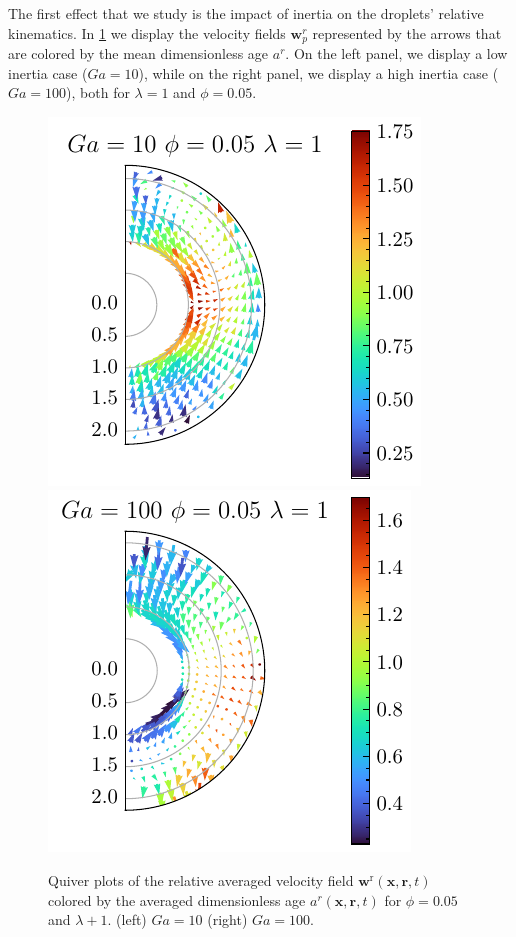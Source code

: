 The first effect that we study is the impact of inertia on the droplets' relative kinematics.    
In \ref{fig:Why_Ga_matter} we display the velocity fields $\textbf{w}_p^r$ represented by the arrows that are colored by the mean dimensionless age $a^r$.  
On the left panel, we display a low inertia case ($Ga = 10$), while on the right panel, we display a high inertia case ($Ga=100$), both for $\lambda =1$ and $\phi=0.05$.
\begin{figure}[h!]
    \centering
    \includegraphics[height=0.35\textwidth]{image/HOMOGENEOUS_NEW/Dist/U_rel_l_1_Ga_10_PHI_5.pdf}
    \includegraphics[height=0.35\textwidth]{image/HOMOGENEOUS_NEW/Dist/U_rel_l_1_Ga_100_PHI_5.pdf}
    \caption{
         Quiver plots of the relative averaged velocity field $\textbf{w}^\text{r}(\textbf{x},\textbf{r},t)$ colored by the averaged dimensionless age $a^r(\textbf{x},\textbf{r},t)$ for $\phi = 0.05$ and $\lambda +1$.
         (left) $Ga = 10$ (right) $Ga =100$. }
    \label{fig:Why_Ga_matter}
\end{figure}

